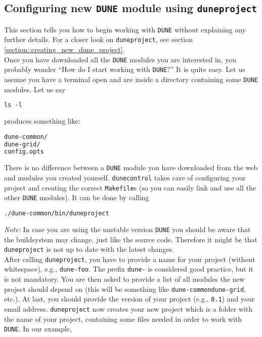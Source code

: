 \documentclass[11pt,a4paper,headinclude,footinclude,DIV16,normalheadings]{scrartcl}
\newcommand{\dune}{\texttt{DUNE}\xspace}
\newcommand{\dunecommon}{\texttt{dune-common}\xspace}
\newcommand{\dunegrid}{\texttt{dune-grid}\xspace}
\newcommand{\dunecontrol}{\texttt{dunecontrol}\xspace}
\newcommand{\duneproject}{\texttt{duneproject}\xspace}
\begin{document}
\subsection{Configuring new \dune module using \duneproject}\label{section::creating_dune_module}

This section tells you how to begin working with \dune without explaining any
further details. For a closer look on \duneproject, see section
\ref{section::creating_new_dune_project}.\\

Once you have downloaded all the \dune modules you are interested in, you probably
wonder ``How do I start working with \dune?'' It is quite easy.
Let us assume you have a terminal open and are inside a directory containing
some \dune modules. Let us say
 
\begin{lstlisting}[language=make]
ls -l
\end{lstlisting}
produces something like:

\begin{lstlisting}[language=make]
dune-common/
dune-grid/
config.opts
\end{lstlisting}

There is no difference between a \dune module you have downloaded from
the web and modules you created yourself.
\dunecontrol takes care of configuring your project and creating the
correct \texttt{Makefile}s (so you can easily link and use all the other \dune
modules). It can be done by calling
 
\begin{lstlisting}[language=make]
./dune-common/bin/duneproject
\end{lstlisting}

\emph{Note:} In case you are using the unstable version
\dune you should be aware that the buildsystem may change,
just like the source code. Therefore it might be that
\texttt{duneproject} is not up to date with the latest changes. \\

After calling \duneproject, you have to provide a name for your project
(without whitespace), e.g., \texttt{dune-foo}. 
The prefix \texttt{dune-} is considered good practice, but it is not
mandatory.
You are then asked to provide a
list of all modules the new project should depend on (this will be
something like \dunecommon \dunegrid, etc.). At last, you should provide
the version of your project (e.g., \texttt{0.1}) and your email address.
\duneproject now creates your new project which is a folder with the name of your project,
containing some files needed in order to work with \dune.
In our example,
 
\end{document}
